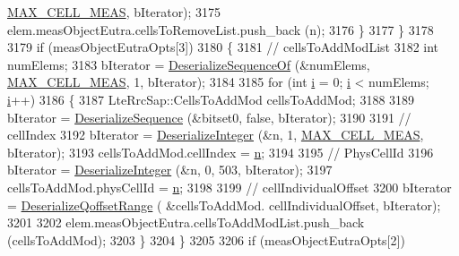 \begin{DoxyCode}
      \hyperlink{lte-rrc-header_8cc_a1d57dacc17deb664f3250c8c9bc5ba0e}{MAX\_CELL\_MEAS}, bIterator);
3175                       elem.measObjectEutra.cellsToRemoveList.push\_back (n);
3176                     \}
3177                 \}
3178 
3179               \textcolor{keywordflow}{if} (measObjectEutraOpts[3])
3180                 \{
3181                   \textcolor{comment}{// cellsToAddModList}
3182                   \textcolor{keywordtype}{int} numElems;
3183                   bIterator = \hyperlink{classns3_1_1Asn1Header_a1a7245e05b482df8abade0a060bd0ecc}{DeserializeSequenceOf} (&numElems, 
      \hyperlink{lte-rrc-header_8cc_a1d57dacc17deb664f3250c8c9bc5ba0e}{MAX\_CELL\_MEAS}, 1, bIterator);
3184 
3185                   \textcolor{keywordflow}{for} (\textcolor{keywordtype}{int} \hyperlink{bernuolliDistribution_8m_a6f6ccfcf58b31cb6412107d9d5281426}{i} = 0; \hyperlink{bernuolliDistribution_8m_a6f6ccfcf58b31cb6412107d9d5281426}{i} < numElems; \hyperlink{bernuolliDistribution_8m_a6f6ccfcf58b31cb6412107d9d5281426}{i}++)
3186                     \{
3187                       LteRrcSap::CellsToAddMod cellsToAddMod;
3188 
3189                       bIterator = \hyperlink{classns3_1_1Asn1Header_a58c68bb97ba3fe2e8fcdd7c208d672b2}{DeserializeSequence} (&bitset0, \textcolor{keyword}{false}, bIterator);
3190 
3191                       \textcolor{comment}{// cellIndex}
3192                       bIterator = \hyperlink{classns3_1_1Asn1Header_a49802c9af30018b078150e866b6ecae2}{DeserializeInteger} (&n, 1, 
      \hyperlink{lte-rrc-header_8cc_a1d57dacc17deb664f3250c8c9bc5ba0e}{MAX\_CELL\_MEAS}, bIterator);
3193                       cellsToAddMod.cellIndex = \hyperlink{namespacesample-rng-plot_aeb5ee5c431e338ef39b7ac5431242e1d}{n};
3194 
3195                       \textcolor{comment}{// PhysCellId}
3196                       bIterator = \hyperlink{classns3_1_1Asn1Header_a49802c9af30018b078150e866b6ecae2}{DeserializeInteger} (&n, 0, 503, bIterator);
3197                       cellsToAddMod.physCellId = \hyperlink{namespacesample-rng-plot_aeb5ee5c431e338ef39b7ac5431242e1d}{n};
3198 
3199                       \textcolor{comment}{// cellIndividualOffset}
3200                       bIterator = \hyperlink{classns3_1_1RrcAsn1Header_aca9c8488200eb19c7bc853225777c8df}{DeserializeQoffsetRange} ( &cellsToAddMod.
      cellIndividualOffset, bIterator);
3201 
3202                       elem.measObjectEutra.cellsToAddModList.push\_back (cellsToAddMod);
3203                     \}
3204                 \}
3205 
3206               \textcolor{keywordflow}{if} (measObjectEutraOpts[2])

\end{DoxyCode}
